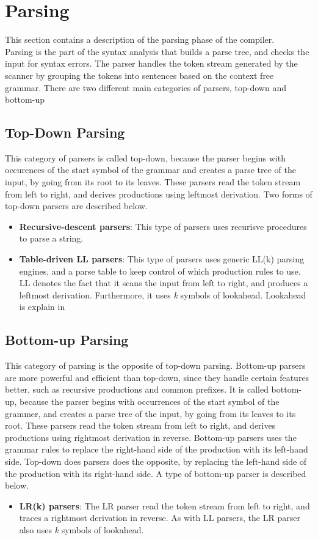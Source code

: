 \section{Parsing}
This section contains a description of the parsing phase of the compiler. 
\\Parsing is the part of the syntax analysis that builds a parse tree, and checks the input for syntax errors. The parser handles the token stream generated by the scanner by grouping the tokens into sentences based on the context free grammar. There are two different main categories of parsers, top-down and bottom-up

\subsection{Top-Down Parsing}
This category of parsers is called top-down, because the parser begins with occurences of the start symbol of the grammar and creates a parse tree of the input, by going from its root to its leaves. These parsers read the token stream from left to right, and derives productions using leftmost derivation. Two forms of top-down parsers are described below. 

\begin{itemize}
\item \textbf{Recursive-descent parsers}: This type of parsers uses recurisve procedures to parse a string. 
\item \textbf{Table-driven LL parsers}: This type of parsers uses generic LL(k) parsing engines, and a parse table to keep control of which production rules to use. LL denotes the fact that it scans the input from left to right, and produces a leftmost derivation. Furthermore, it uses \textit{k} symbols of lookahead. Lookahead is explain in 
\end{itemize}

\subsection{Bottom-up Parsing}
This category of parsing is the opposite of top-down parsing. Bottom-up parsers are more powerful and efficient than top-down, since they handle certain features better, such as recursive productions and common prefixes. It is called bottom-up, because the parser begins with occurrences of the start symbol of the grammer, and creates a parse tree of the input, by going from its leaves to its root. These parsers read the token stream from left to right, and derives productions using rightmost derivation in reverse. Bottom-up parsers uses the grammar rules to replace the right-hand side of the production with its left-hand side. Top-down does parsers does the opposite, by replacing the left-hand side of the production with its right-hand side. A type of bottom-up parser is described below. 

\begin{itemize}
\item \textbf{LR(k) parsers}: The LR parser read the token stream from left to right, and traces a rightmost derivation in reverse. As with LL parsers, the LR parser also uses \textit{k} symbols of lookahead.  
\end{itemize}

